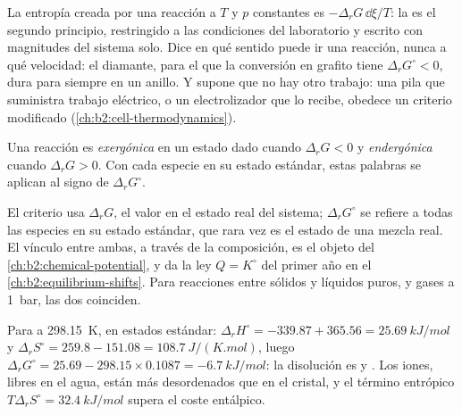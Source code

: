 \begin{remark}\label{rem:b2:reaction-free-energy:criterion}
La entropía creada por una reacción a $T$ y $p$ constantes es $-\Delta_r G\,
\dd\xi/T$: la  es el segundo principio, restringido a las condiciones
del laboratorio y escrito con magnitudes del sistema solo. Dice
en qué sentido puede ir una reacción, nunca a qué velocidad: el diamante, para el que
la conversión en grafito tiene $\Delta_r G^\circ < 0$, dura para siempre en un
anillo. Y supone que no hay otro trabajo: una pila que suministra trabajo eléctrico, o un
electrolizador que lo recibe, obedece un criterio modificado
(\cref{ch:b2:cell-thermodynamics}).
\end{remark}

\begin{definition}\label{def:b2:reaction-free-energy:exergonic}
Una reacción es \emph{exergónica} en un estado dado cuando
$\Delta_r G < 0$ y \emph{endergónica} cuando $\Delta_r G >
0$. Con cada especie en su estado estándar, estas palabras se aplican al signo
de $\Delta_r G^\circ$.
\end{definition}

El criterio usa $\Delta_r G$, el valor en el estado real del
sistema; $\Delta_r G^\circ$ se refiere a todas las especies en su estado estándar,
que rara vez es el estado de una mezcla real. El vínculo entre ambas, a través de
la composición, es el objeto del \cref{ch:b2:chemical-potential}, y
da la ley $Q = K^\circ$ del primer año en el \cref{ch:b2:equilibrium-shifts}. Para
reacciones entre sólidos y líquidos puros, y gases a \qty{1}{bar}, las
dos coinciden.

\begin{example}\label{ex:b2:reaction-free-energy:cold-pack}
Para  a \qty{298.15}{K}, en estados
estándar: $\Delta_r H^\circ = -339.87 + 365.56 = \qty{+25.69}{kJ/mol}$ y
$\Delta_r S^\circ = 259.8 - 151.08 = \qty{+108.7}{J/(K.mol)}$, luego
$\Delta_r G^\circ = 25.69 - 298.15 \times 0.1087 = \qty{-6.7}{kJ/mol}$: la
disolución es  y . Los iones, libres en el agua, están
más desordenados que en el cristal, y el término entrópico $T\Delta_r
S^\circ = \qty{32.4}{kJ/mol}$ supera el coste entálpico.
\end{example}

